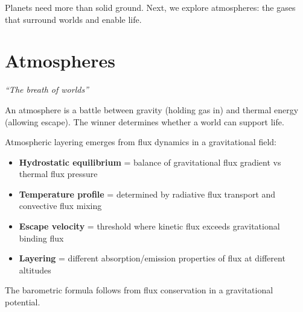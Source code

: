 \documentclass[
  11pt,
  letterpaper,
  twoside,
  openright]{book}
\providecommand{\tightlist}{%
  \setlength{\itemsep}{0pt}\setlength{\parskip}{0pt}}
\begin{document}
Planets need more than solid ground. Next, we explore atmospheres: the
gases that surround worlds and enable life.

\chapter{Atmospheres}\label{sec-atmospheres}

\emph{``The breath of worlds''}

\begin{tcolorbox}[enhanced jigsaw, leftrule=.75mm, title=\textcolor{quarto-callout-note-color}{\faInfo}\hspace{0.5em}{Key Revelation}, bottomrule=.15mm, opacityback=0, coltitle=black, arc=.35mm, colframe=quarto-callout-note-color-frame, colbacktitle=quarto-callout-note-color!10!white, colback=white, titlerule=0mm, breakable, bottomtitle=1mm, toptitle=1mm, rightrule=.15mm, toprule=.15mm, left=2mm, opacitybacktitle=0.6]

An atmosphere is a battle between gravity (holding gas in) and thermal
energy (allowing escape). The winner determines whether a world can
support life.

\end{tcolorbox}

\begin{tcolorbox}[enhanced jigsaw, leftrule=.75mm, title=\textcolor{quarto-callout-note-color}{\faInfo}\hspace{0.5em}{How FTD Produces Atmospheric Structure}, bottomrule=.15mm, opacityback=0, coltitle=black, arc=.35mm, colframe=quarto-callout-note-color-frame, colbacktitle=quarto-callout-note-color!10!white, colback=white, titlerule=0mm, breakable, bottomtitle=1mm, toptitle=1mm, rightrule=.15mm, toprule=.15mm, left=2mm, opacitybacktitle=0.6]

Atmospheric layering emerges from flux dynamics in a gravitational
field:

\begin{itemize}
\tightlist
\item
  \textbf{Hydrostatic equilibrium} = balance of gravitational flux
  gradient vs thermal flux pressure
\item
  \textbf{Temperature profile} = determined by radiative flux transport
  and convective flux mixing
\item
  \textbf{Escape velocity} = threshold where kinetic flux exceeds
  gravitational binding flux
\item
  \textbf{Layering} = different absorption/emission properties of flux
  at different altitudes
\end{itemize}

The barometric formula follows from flux conservation in a gravitational
potential.

\end{tcolorbox}
\end{document}
